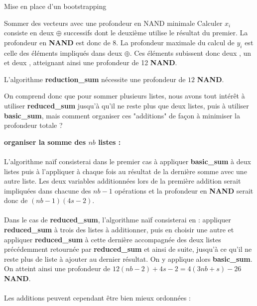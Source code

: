 \begin{section}{Mise en place d'un bootstrapping}
\begin{subsection}{Sommer des vecteurs avec une profondeur en NAND minimale}
	Calculer $x_i$ consiste en deux $\oplus$ successifs dont le deuxième utilise le résultat du premier. La profondeur en \textbf{NAND} est donc de 8. La profondeur maximale du calcul de $y_i$ est celle des éléments impliqués dans deux $\oplus$. Ces éléments subissent donc deux , un  et deux , atteignant ainsi une profondeur de 12 \textbf{NAND}.

\begin{prop}
	L'algorithme \textbf{reduction\_sum} nécessite une profondeur de $12$ \textbf{NAND}.
\end{prop}

	On comprend donc que pour sommer plusieurs listes, nous avons tout intérêt à utiliser \textbf{reduced\_sum} jusqu'à qu'il ne reste plus que deux listes, puis à utiliser \textbf{basic\_sum}, mais comment organiser ces "additions" de façon à minimiser la profondeur totale ?

\vspace{0.3cm}
\noindent
\textbf{organiser la somme des $nb$ listes :}
\paragraph{}
	L'algorithme naïf consisterai dans le premier cas à appliquer \textbf{basic\_sum} à deux listes puis à l'appliquer à chaque fois au résultat de la dernière somme avec une autre liste. Les deux variables additionnées lors de la première addition serait impliquées dans chacune	des $nb-1$ opérations et la profondeur en \textbf{NAND} serait donc de $(nb-1)(4 s - 2)$.
	
\paragraph{}
	Dans le cas de \textbf{reduced\_sum}, l'algorithme naïf consisterai en : appliquer \textbf{reduced\_sum} à trois des listes à additionner, puis en choisir une autre et appliquer \textbf{reduced\_sum} à cette dernière accompagnée des deux listes précédemment retournée par \textbf{reduced\_sum} et ainsi de suite, jusqu'à ce qu'il ne reste plus de liste à ajouter au dernier résultat. On y applique alors \textbf{basic\_sum}. On atteint ainsi une profondeur de $12(nb - 2) + 4 s- 2 = 4(3nb + s) - 26$ \textbf{NAND}.
	
\paragraph{}
	Les additions peuvent cependant être bien mieux ordonnées :
	

\end{subsection}
\end{section}
